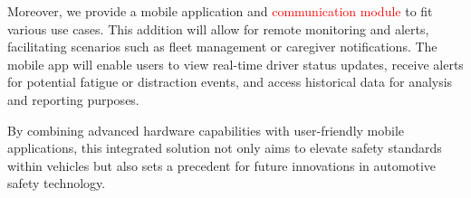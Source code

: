 \vspace{\baselineskip}

Moreover, we provide a mobile application and \textcolor{red}{communication module} to fit various use cases. This addition will allow for remote monitoring and alerts, facilitating scenarios such as fleet management or caregiver notifications. The mobile app will enable users to view real-time driver status updates, receive alerts for potential fatigue or distraction events, and access historical data for analysis and reporting purposes.

\vspace{\baselineskip}

By combining advanced hardware capabilities with user-friendly mobile applications, this integrated solution not only aims to elevate safety standards within vehicles but also sets a precedent for future innovations in automotive safety technology.

